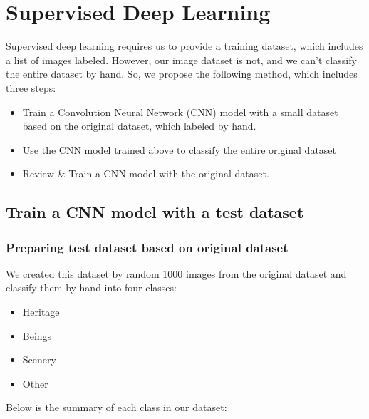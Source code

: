 \documentclass[11pt]{article}
\begin{document}
\section{Supervised Deep Learning}
Supervised deep learning requires us to provide a training dataset, which includes a list of images labeled. However, our image dataset is not, and we can't classify the entire dataset by hand. So, we propose the following method, which includes three steps:
\begin{itemize}
\item Train a Convolution Neural Network (CNN) model with a small dataset based on the original dataset, which labeled by hand.
\item Use the CNN model trained above to classify the entire original dataset
\item Review \& Train a CNN model with the original dataset.
\end{itemize}

\subsection{Train a CNN model with a test dataset}

\subsubsection{Preparing test dataset based on original dataset}
We created this dataset by random 1000 images from the original dataset and classify them by hand into four classes: 
\begin{itemize}
\item Heritage
\item Beings
\item Scenery
\item Other
\end{itemize}
Below is the summary of each class in our dataset:
\end{document}

